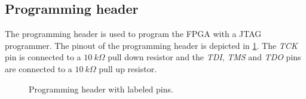\subsection{Programming header}
The programming header is used to program the FPGA with a JTAG programmer.
The pinout of the programming header is depicted in \cref{fig:programming_header}.
The \textit{TCK} pin is connected to a $\SI{10}{k\Omega}$ pull down resistor and the \textit{TDI}, \textit{TMS} and \textit{TDO} pins are connected to a $\SI{10}{k\Omega}$ pull up resistor.

\begin{figure}[h!]
    \centering
    
    \caption{Programming header with labeled pins.}
    \label{fig:programming_header}
\end{figure}
